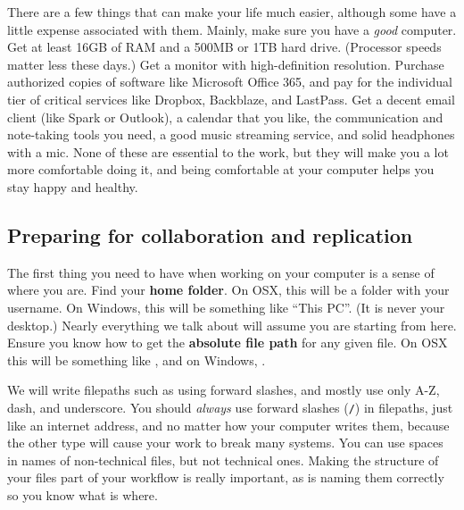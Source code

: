 There are a few things that can make your life much easier,
although some have a little expense associated with them.
Mainly, make sure you have a \textit{good} computer.
Get at least 16GB of RAM and a 500MB or 1TB hard drive.
(Processor speeds matter less these days.)
Get a monitor with high-definition resolution.
Purchase authorized copies of software like Microsoft Office 365,
and pay for the individual tier of critical services like Dropbox, Backblaze, and LastPass.
Get a decent email client (like Spark or Outlook),
a calendar that you like, the communication and note-taking tools you need,
a good music streaming service, and solid headphones with a mic.
None of these are essential to the work,
but they will make you a lot more comfortable doing it,
and being comfortable at your computer helps you stay happy and healthy.

\subsection{Preparing for collaboration and replication}

The first thing you need to have when working on your computer is a sense of where you are.
Find your \textbf{home folder}. On OSX, this will be a folder with your username.
On Windows, this will be something like ``This PC''. (It is never your desktop.)
Nearly everything we talk about will assume you are starting from here.
Ensure you know how to get the \textbf{absolute file path} for any given file.
On OSX this will be something like ,
and on Windows, .

We will write filepaths such as 
using forward slashes, and mostly use only A-Z, dash, and underscore.
You should \textit{always} use forward slashes (\texttt{/}) in filepaths,
just like an internet address, and no matter how your computer writes them,
because the other type will cause your work to break many systems.
You can use spaces in names of non-technical files, but not technical ones.
Making the structure of your files part of your workflow is really important,
as is naming them correctly so you know what is where.


